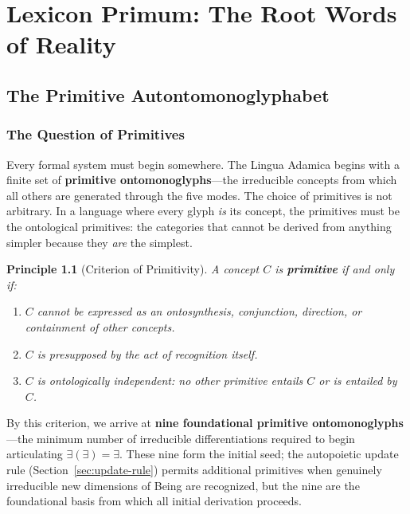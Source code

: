 \documentclass[12pt, letterpaper]{book}
\def\equiv{=}%
\newtheorem{principle}{Principle}[chapter]
\newcommand{\E}{\exists}                          %
\newcommand{\EE}{\exists(\exists)}                 %
\begin{document}
\vfill



\part{Lexicon Primum: The Root Words of Reality}

\chapter{The Primitive Autontomonoglyphabet}\label{ch:primitives}

\section{The Question of Primitives}

Every formal system must begin somewhere. The Lingua Adamica begins with a finite set of \textbf{primitive ontomonoglyphs}---the irreducible concepts from which all others are generated through the five modes. The choice of primitives is not arbitrary. In a language where every glyph \textit{is} its concept, the primitives must be the ontological primitives: the categories that cannot be derived from anything simpler because they \textit{are} the simplest.

\begin{principle}[Criterion of Primitivity]
A concept $C$ is \textbf{primitive} if and only if:
\begin{enumerate}[label=(\roman*)]
    \item $C$ cannot be expressed as an ontosynthesis, conjunction, direction, or containment of other concepts.
    \item $C$ is presupposed by the act of recognition itself.
    \item $C$ is ontologically independent: no other primitive entails $C$ or is entailed by $C$.
\end{enumerate}
\end{principle}

By this criterion, we arrive at \textbf{nine foundational primitive ontomonoglyphs}---the minimum number of irreducible differentiations required to begin articulating $\EE \equiv \E$. These nine form the initial seed; the autopoietic update rule (Section~\ref{sec:update-rule}) permits additional primitives when genuinely irreducible new dimensions of Being are recognized, but the nine are the foundational basis from which all initial derivation proceeds.
\end{document}
